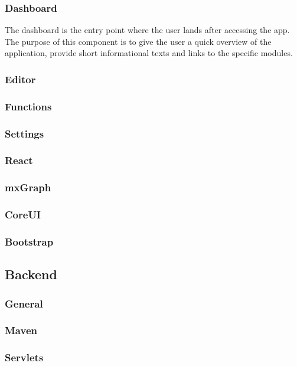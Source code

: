 \documentclass[a4paper,11pt,pdftex,halfparskip,cleardoubleempty]{scrbook}
\begin{document}
\subsubsection{Dashboard}

The dashboard is the entry point where the user lands after accessing the app. The purpose of this component is to give the user a quick overview of the application, provide short informational texts and links to the specific modules. 

\subsubsection{Editor}
\subsubsection{Functions}
\subsubsection{Settings}


\subsubsection{React}
\subsubsection{mxGraph}
\subsubsection{CoreUI}
\subsubsection{Bootstrap}


\subsection{Backend}

\subsubsection{General}
\subsubsection{Maven}
\subsubsection{Servlets}
\end{document}

